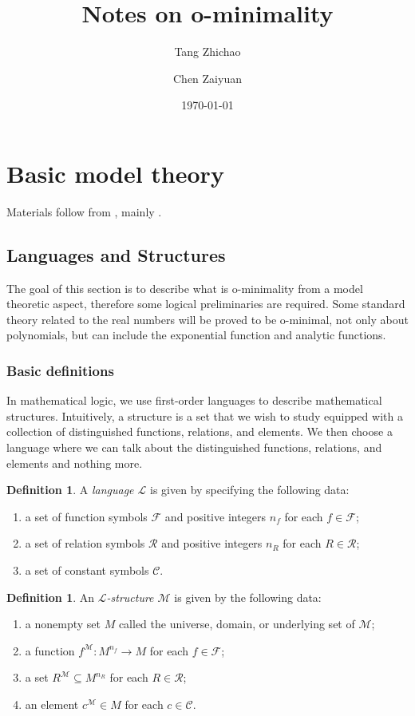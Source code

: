 \documentclass{amsart}
\title{Notes on o-minimality}
\author{Tang Zhichao}
\author{Chen Zaiyuan}
\date{\today}
\theoremstyle{definition}
\newtheorem{definition}[theorem]{Definition}
\numberwithin{equation}{section}
\begin{document}
\maketitle

\section{Basic model theory}
Materials follow from \cite{zbMATH01821671,zbMATH01160037},
mainly \cite{zbMATH01821671}.
\subsection{Languages and Structures}
The goal of this section is to describe what is o-minimality
from a model theoretic aspect,
therefore some logical preliminaries are required.
Some standard theory related to the real numbers
will be proved to be o-minimal,
not only about polynomials, but can include the exponential function and analytic functions.

\subsubsection{Basic definitions}
In mathematical logic,
we use first-order languages to describe mathematical structures.
Intuitively, a structure is a set that we wish to study equipped with a collection of distinguished functions, relations, and elements.
We then choose a language where we can talk about the distinguished functions, relations, and elements and nothing more.

\begin{definition}
  A \emph{language $\mathcal{L}$} is given by specifying the following data:
  \begin{enumerate}[label = {(\roman*)}]
    \item a set of function symbols $\mathcal{F}$ and positive integers $n_f$ for each $f \in \mathcal{F}$;
    \item a set of relation symbols $\mathcal{R}$ and positive integers $n_R$ for each $R \in \mathcal{R}$;
    \item a set of constant symbols $\mathcal{C}$.
  \end{enumerate}
\end{definition}

\begin{definition}
  An \emph{$\mathcal{L}$-structure $\mathcal{M}$} is given by the following data:
  \begin{enumerate}[label = {(\roman*)}]
    \item a nonempty set $M$ called the universe, domain, or underlying set of $\mathcal{M}$;
    \item a function $f^{\mathcal{M}} : M^{n_f} \to M$ for each $f \in \mathcal{F}$;
    \item a set $R^{\mathcal{M}} \subseteq M^{n_R}$ for each $R \in \mathcal{R}$;
    \item an element $c^{\mathcal{M}} \in M$ for each $c \in \mathcal{C}$.
  \end{enumerate}
\end{definition}
\end{document}
